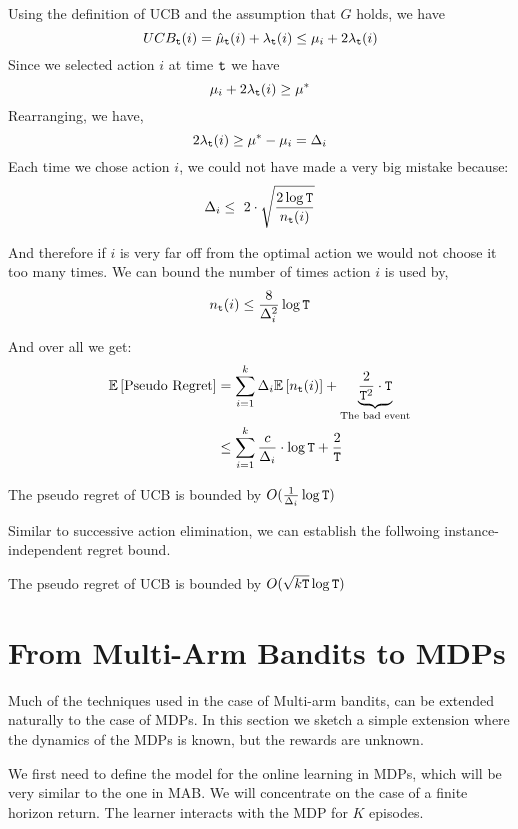 Using the definition of UCB and the assumption that $G$ holds, we
have
\[
UCB_{{\tt t}}(i)=\hat{\mu}_{{\tt t}}(i)+\lambda_{{\tt t}}(i)\le\mu_{i}+2\lambda_{{\tt t}}(i)
\]
Since we selected action $i$ at time ${\tt t}$ we have
\[
\mu_{i}+2\lambda_{{\tt t}}(i)\ge\mu^{*}
\]
Rearranging, we have,
\[
2\lambda_{{\tt t}}(i)\ge\mu^{*}-\mu_{i}=\Delta_{i}
\]
Each time we chose action $i$, we could not have made a very big
mistake because:
\[
\Delta_{i}\leq\text{ }2\cdot\sqrt{\frac{2\log {\tt T}}{n_{{\tt t}}(i)}}
\]

And therefore if $i$ is very far off from the optimal action we
would not choose it too many times. We can bound the number of times
action $i$ is used by,
\[
n_{{\tt t}}(i)\leq\frac{8}{\Delta_{i}^{2}}\log {\tt T}
\]

And over all we get:
\begin{align*}
\mathbb{E}\left[\text{Pseudo Regret}\right] & =
\sum_{i=1}^{k}\Delta_{i}\mathbb{E}\left[n_{{\tt t}}(i)\right]+\underbrace{\frac{2}{{\tt T}^{2}}\cdot
{\tt T}}_{\text{The bad event}}
\\
 & \le  \sum_{i=1}^{k}\frac{c}{\Delta_{i}}\cdot\log {\tt T}+\frac{2}{{\tt T}}
\end{align*}

\begin{theorem}
\label{thm:MAB:UCB1}
The pseudo regret of UCB is bounded by $O(\frac{1}{\Delta_{i}}\log {\tt T})$
\end{theorem}

Similar to successive action elimination, we can establish the follwoing instance-independent regret bound. 

\begin{theorem}
\label{thm:MAB:UCB2}
The pseudo regret of UCB is bounded by $O( \sqrt{k{\tt T}}\log{\tt T})$
\end{theorem}

\section{From Multi-Arm Bandits to MDPs}

Much of the techniques used in the case of Multi-arm bandits, can be extended naturally to the case of MDPs. In this section we sketch a simple extension where the dynamics of the MDPs is known, but the rewards are unknown.

We first need to define the model for the online learning in MDPs, which will be very similar to the one in MAB. We will concentrate on the case of a finite horizon return. The learner interacts with the MDP for $K$ episodes.

